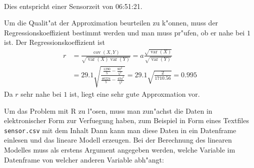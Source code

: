\begin{loesung}
\begin{teilaufgaben}
\begin{align*}
\end{align*}
Dies entspricht einer Sensorzeit von 06:51:21.
\item
Um die Qualit"at der Approximation beurteilen zu k"onnen, muss
der Regressionskoeffizient bestimmt werden und man muss pr"ufen,
ob er nahe bei $1$ ist. Der Regressionskoeffizient ist
\begin{align*}
r&=\frac{\operatorname{cov}(X,Y)}{\sqrt{\operatorname{var}(X)\operatorname{var}(Y)}}
=a\frac{\sqrt{\operatorname{var}(X)}}{\sqrt{\operatorname{var}(Y)}}
\\
&=
29.1 \sqrt{\frac{\frac{1290}{5}-\frac{80^2}{5^2}}{\frac{46224}{5}-\frac{434^2}{5^2}}}
=29.1 \sqrt{\frac{2}{1710.56}}= 0.995
\end{align*}
Da $r$ sehr nahe bei $1$ ist, liegt eine sehr gute Approxmation vor.
\item
Um das Problem mit R zu l"osen, muss man zun"achst die Daten in
elektronischer Form zur Verfuegung haben, zum Beispiel in Form
eines Textfiles {\tt sensor.csv} mit dem Inhalt
Dann kann man diese Daten in ein Datenframe einlesen und das lineare
Modell erzeugen. Bei der Berechnung des linearen Modelles muss als
erstens Argument angegeben werden, welche Variable im Datenframe von
welcher anderen Variable abh"angt:
\end{teilaufgaben}
\end{loesung}

